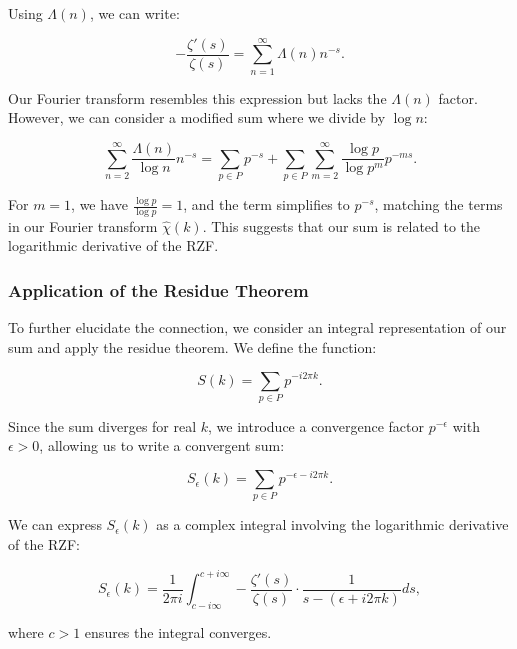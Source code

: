 \documentclass[11pt, oneside]{article}
\begin{document}
Using $\Lambda(n)$, we can write:

\begin{equation}
-\frac{\zeta'(s)}{\zeta(s)} = \sum_{n=1}^\infty \Lambda(n) n^{-s}.
\end{equation}

Our Fourier transform resembles this expression but lacks the $\Lambda(n)$ factor. However, we can consider a modified sum where we divide by $\log n$:

\begin{equation}
\sum_{n=2}^\infty \frac{\Lambda(n)}{\log n} n^{-s} = \sum_{p \in P} p^{-s} + \sum_{p \in P} \sum_{m=2}^\infty \frac{\log p}{\log p^m} p^{-m s}.
\end{equation}

For $m = 1$, we have $\frac{\log p}{\log p} = 1$, and the term simplifies to $p^{-s}$, matching the terms in our Fourier transform $\hat{\chi}(k)$. This suggests that our sum is related to the logarithmic derivative of the RZF.

\subsubsection{Application of the Residue Theorem}

To further elucidate the connection, we consider an integral representation of our sum and apply the residue theorem. We define the function:

\begin{equation}
S(k) = \sum_{p \in P} p^{-i 2\pi k}.
\end{equation}

Since the sum diverges for real $k$, we introduce a convergence factor $p^{-\epsilon}$ with $\epsilon > 0$, allowing us to write a convergent sum:

\begin{equation}
S_\epsilon(k) = \sum_{p \in P} p^{- \epsilon - i 2\pi k}.
\end{equation}

We can express $S_\epsilon(k)$ as a complex integral involving the logarithmic derivative of the RZF:

\begin{equation}
S_\epsilon(k) = \frac{1}{2\pi i} \int_{c - i \infty}^{c + i \infty} -\frac{\zeta'(s)}{\zeta(s)} \cdot \frac{1}{s - (\epsilon + i 2\pi k)} ds,
\end{equation}

where $c > 1$ ensures the integral converges.
\end{document}
